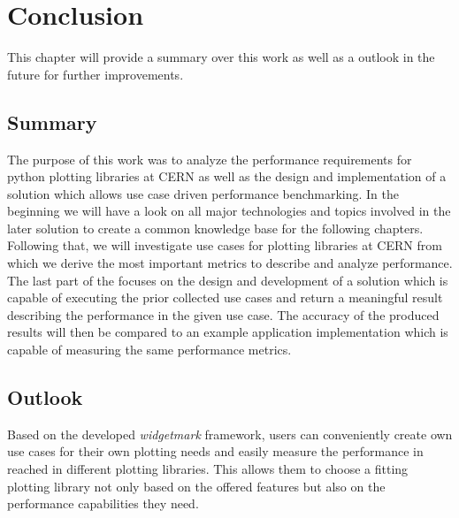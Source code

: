 

\chapter{Conclusion}
\label{ch:Conclusion}

This chapter will provide a summary over this work as well as a outlook in the
future for further improvements.

\section{Summary}
\label{sec:Conclusion:Summary}

The purpose of this work was to analyze the performance requirements for
python plotting libraries at CERN as well as the design and implementation of a
solution which allows use case driven performance benchmarking.
In the beginning we will have a look on all major technologies and topics involved in the
later solution to create a common knowledge base for the following chapters.
Following that, we will investigate use cases for plotting libraries at CERN
from which we derive the most important metrics to describe and analyze
performance. The last part of the focuses on the design and development of a
solution which is capable of executing the prior collected use cases and return
a meaningful result describing the performance in the given use case. The
accuracy of the produced results will then be compared to an example
application implementation which is capable of measuring the same performance
metrics.

\section{Outlook}
\label{sec:Conclusion:Outlook}

Based on the developed \emph{widgetmark} framework, users can conveniently
create own use cases for their own plotting needs and easily measure the
performance in reached in different plotting libraries. This allows them to
choose a fitting plotting library not only based on the offered features but
also on the performance capabilities they need.


